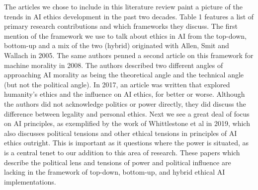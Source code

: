 \documentclass{svproc}
\begin{document}
The articles we chose to include in this literature review paint a picture of the trends in AI ethics development in the past two decades. Table 1 features a list of primary research contributions and which frameworks they discuss. The first mention of the framework we use to talk about ethics in AI from the top-down, bottom-up and a mix of the two (hybrid) originated with Allen, Smit and Wallach in 2005. \cite{Allen2005ArtificialApproaches} The same authors penned a second article on this framework for machine morality in 2008. \cite{Wallach2008MachineFaculties} The authors described two different angles of approaching AI morality as being the theoretical angle and the technical angle (but not the political angle). In 2017, \cite{Etzioni2017IncorporatingIntelligence} an article was written that explored humanity’s ethics and the influence on AI ethics, for better or worse. Although the authors did not acknowledge politics or power directly, they did discuss the difference between legality and personal ethics. Next we see a great deal of focus on AI principles, as exemplified by the work of Whittlestone et al in 2019, \cite{Whittlestone2019TheEthics} which also discusses political tensions and other ethical tensions in principles of AI ethics outright. This is important as it questions where the power is situated, as is a central tenet to our addition to this area of research. These papers which describe the political lens and tensions of power and political influence are lacking in the framework of top-down, bottom-up, and hybrid ethical AI implementations.
\end{document}
